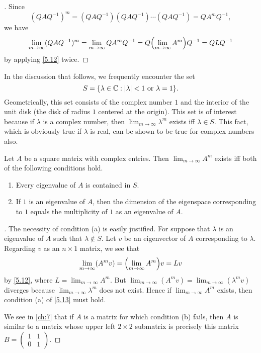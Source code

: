 \begin{proof}[]
	Since
	\[
		(Q A Q^{-1})^m = (Q A Q^{-1}) (Q A Q^{-1}) \cdots (Q A Q^{-1}) = Q A^m Q^{-1},
	\]
	we have
	\[
		\lim_{m \to \infty} (Q A Q^{-1})^m = \lim_{m \to \infty} Q A^m Q^{-1} = Q \pa{\lim_{m \to \infty} A^m} Q^{-1} = Q L Q^{-1}
	\]
	by applying \cref{5.12} twice.
\end{proof}

\begin{defn}\label{5.3.3}
	In the discussion that follows, we frequently encounter the set
	\[
		S = \set{\lambda \in \C : \abs{\lambda} < 1 \text{ or } \lambda = 1}.
	\]
	Geometrically, this set consists of the complex number \(1\) and the interior of the unit disk (the disk of radius \(1\) centered at the origin).
	This set is of interest because if \(\lambda\) is a complex number, then \(\lim_{m \to \infty} \lambda^m\) exists iff \(\lambda \in S\).
	This fact, which is obviously true if \(\lambda\) is real, can be shown to be true for complex numbers also.
\end{defn}

\begin{thm}\label{5.13}
	Let \(A\) be a square matrix with complex entries.
	Then \(\lim_{m \to \infty} A^m\) exists iff both of the following conditions hold.
	\begin{enumerate}
		\item Every eigenvalue of \(A\) is contained in \(S\).
		\item If \(1\) is an eigenvalue of \(A\), then the dimension of the eigenspace corresponding to \(1\) equals the multiplicity of \(1\) as an eigenvalue of \(A\).
	\end{enumerate}
\end{thm}

\begin{proof}[]
	The necessity of condition (a) is easily justified.
	For suppose that \(\lambda\) is an eigenvalue of \(A\) such that \(\lambda \notin S\).
	Let \(v\) be an eigenvector of \(A\) corresponding to \(\lambda\).
	Regarding \(v\) as an \(n \times 1\) matrix, we see that
	\[
		\lim_{m \to \infty} (A^m v) = \pa{\lim_{m \to \infty} A^m} v = Lv
	\]
	by \cref{5.12}, where \(L = \lim_{m \to \infty} A^m\).
	But \(\lim_{m \to \infty} (A^m v) = \lim_{m \to \infty} (\lambda^m v)\) diverges because \(\lim_{m \to \infty} \lambda^m\) does not exist.
	Hence if \(\lim_{m \to \infty} A^m\) exists, then condition (a) of \cref{5.13} must hold.

	We see in \cref{ch:7} that if \(A\) is a matrix for which condition (b) fails, then \(A\) is similar to a matrix whose upper left \(2 \times 2\) submatrix is precisely this matrix \(B = \begin{pmatrix}
		1 & 1 \\
		0 & 1
	\end{pmatrix}\).
\end{proof}

